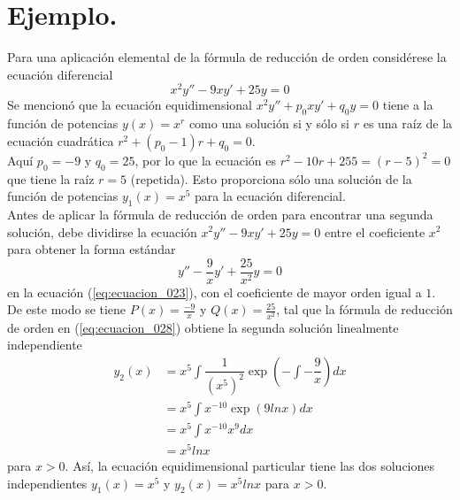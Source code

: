 \section{Ejemplo.}
Para una aplicación elemental de la fórmula de reducción de orden considérese la ecuación diferencial
\[ x^{2} y''- 9 x y' + 25 y = 0 \]
Se mencionó que la ecuación equidimensional $x^{2} y'' + p_{0} x y' + q_{0} y = 0$ tiene a la función de potencias $y(x) = x^{r}$ como una solución si y sólo si $r$ es una raíz de la ecuación cuadrática $r^{2} + (p_{0} - 1)r + q_{0} = 0$. 
\\
Aquí $p_{0} = -9$ y $q_{0} = 25$, por lo que la ecuación es $r^{2} - 10r + 25 5= (r - 5)^{2} = 0$ que tiene la raíz $r = 5$ (repetida). Esto proporciona sólo una solución de la función de potencias $y_{1}(x) = x^{5}$ para la ecuación diferencial.
\\
Antes de aplicar la fórmula de reducción de orden para encontrar una segunda solución, debe dividirse la ecuación $x^{2} y'' - 9 x y' + 25 y = 0$ entre el coeficiente $x^{2}$ para obtener la forma estándar
\[ y'' - \dfrac{9}{x} y' + \dfrac{25}{x^{2}} y = 0 \]
en la ecuación (\ref{eq:ecuacion_023}), con el coeficiente de mayor orden igual a $1$. De este modo se tiene $P(x) = \frac{-9}{x}$ y $Q(x) = \frac{25}{x^{2}}$, tal que la fórmula de reducción de orden en (\ref{eq:ecuacion_028}) obtiene la segunda solución linealmente independiente
\[ \begin{split}
y_{2}(x) &= x^{5} \int \dfrac{1}{(x^{5})^{2}} \exp \left( - \int - \dfrac{9}{x} \right) dx \\
&= x^{5} \int x^{-10} \exp (9 ln x) dx  \\
&= x^{5} \int x^{-10} x^{9} dx \\
&=  x^{5} ln x
\end{split} \]
para $x > 0$. Así, la ecuación equidimensional particular tiene las dos soluciones independientes $y_{1}(x) = x^{5}$ y $y_{2}(x) = x^{5} ln x$ para $x > 0$.

